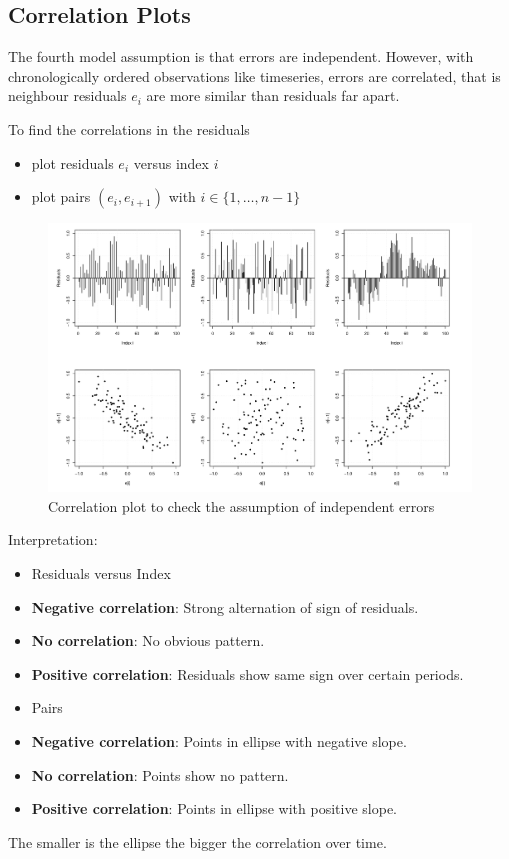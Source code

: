 \documentclass[11pt]{article}
\theoremstyle{definition}
\begin{document}
\subsection{Correlation Plots}
The fourth model assumption is that errors are independent. However, with chronologically ordered observations like timeseries, errors are correlated, that is neighbour residuals $e_i$ are more similar than residuals far apart.

To find the correlations in the residuals
\begin{itemize}[nosep,label=-]
	\item plot residuals $e_i$ versus index $i$
	\item plot pairs $(e_i,e_{i+1})$ with $i\in \{1,\dots,n-1\}$
\end{itemize}

\begin{figure}[H]
	\centering
	\includegraphics[width=0.8\linewidth]{img/correlation_plot}
	\caption{Correlation plot to check the assumption of independent errors}
	\label{fig:correlationplot}
\end{figure}
Interpretation:
\begin{itemize}[nosep]
	\vspace{0.5em}
	\item[] Residuals versus Index
	\item \textbf{Negative correlation}: Strong alternation of sign of residuals.
	\item \textbf{No correlation}: No obvious pattern.
	\item \textbf{Positive correlation}: Residuals show same sign over certain periods.
	\vspace{0.5em}
	\item[] Pairs
	\item \textbf{Negative correlation}: Points in ellipse with negative slope.
	\item \textbf{No correlation}: Points show no pattern.
	\item \textbf{Positive correlation}: Points in ellipse with positive slope.
\end{itemize}
The smaller is the ellipse the bigger the correlation over time.
\end{document}
